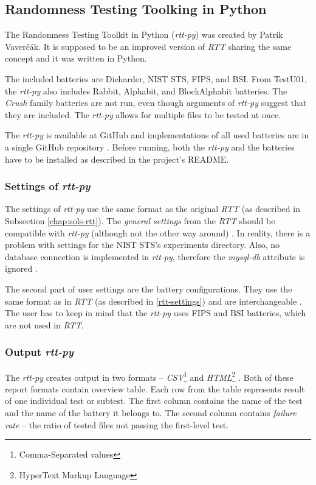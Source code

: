 \documentclass[
  digital,     %
  oneside,     %
  nosansbold,  %
  nocolorbold, %
  nolof,         %
  nolot,         %
]{fithesis4}
\begin{document}
\subsection{Randomness Testing Toolking in Python} \label{chap:sols-rtt-py}
The Randomness Testing Toolkit in Python (\emph{rtt-py}) was created by Patrik Vaverčák. It is supposed to be an improved version of \emph{RTT} sharing the same concept \cite[p.~24]{vavercak} and it was written in Python.

The included batteries are Dieharder, NIST STS, FIPS, and BSI. From TestU01, the \emph{rtt-py} also includes Rabbit, Alphabit, and BlockAlphabit batteries. The \emph{Crush} family batteries are not run, even though arguments of \emph{rtt-py} suggest that they are included. The \emph{rtt-py} allows for multiple files to be tested at once.

The \emph{rtt-py} is available at GitHub \cite{rtt-py-site} and implementations of all used batteries are in a single GitHub repository \cite{rtt-py-batteries}. Before running, both the \emph{rtt-py} and the batteries have to be installed as described in the project's README.

\subsubsection{Settings of \emph{rtt-py}}
The settings of \emph{rtt-py} use the same format as the original \emph{RTT} (as described in Subsection \ref{chap:sols-rtt}). The \emph{general settings} from the \emph{RTT} should be compatible with \emph{rtt-py} (although not the other way around) \cite[p. 25]{vavercak}. In reality, there is a problem with settings for the NIST STS's experiments directory. Also, no database connection is implemented in \emph{rtt-py}, therefore the \emph{mysql-db} attribute is ignored \cite{rtt-py-site}.

The second part of user settings are the battery configurations. They use the same format as in \emph{RTT} (as described in \ref{rtt-settings}) and are interchangeable \cite[p.~25]{vavercak}. The user has to keep in mind that the \emph{rtt-py} uses FIPS and BSI batteries, which are not used in \emph{RTT}. 

\subsubsection{Output \emph{rtt-py}}
The \emph{rtt-py} creates output in two formats -- \emph{CSV}\footnote{Comma-Separated values} and \emph{HTML}\footnote{HyperText Markup Language} \cite[p.~36]{vavercak}. Both of these report formats contain overview table. Each row from the table represents result of one individual test or subtest. The first column contains the name of the test and the name of the battery it belongs to. The second column contains \emph{failure rate} -- the ratio of tested files not passing the first-level test.
\end{document}
